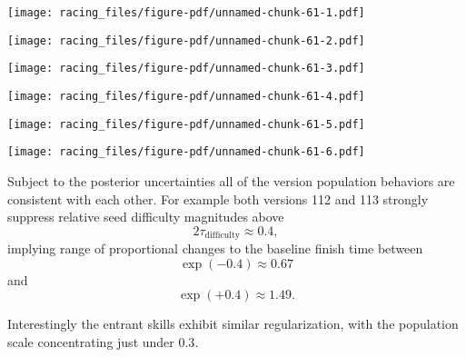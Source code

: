\documentclass[
  letterpaper,
  DIV=11,
  numbers=noendperiod]{scrartcl}
\begin{document}
\texttt{[image: racing\_files/figure-pdf/unnamed-chunk-61-1.pdf]}

\texttt{[image: racing\_files/figure-pdf/unnamed-chunk-61-2.pdf]}

\texttt{[image: racing\_files/figure-pdf/unnamed-chunk-61-3.pdf]}

\texttt{[image: racing\_files/figure-pdf/unnamed-chunk-61-4.pdf]}

\texttt{[image: racing\_files/figure-pdf/unnamed-chunk-61-5.pdf]}

\texttt{[image: racing\_files/figure-pdf/unnamed-chunk-61-6.pdf]}

Subject to the posterior uncertainties all of the version population
behaviors are consistent with each other. For example both versions 112
and 113 strongly suppress relative seed difficulty magnitudes above \[
2 \tau_{\mathrm{difficulty}} \approx 0.4,
\] implying range of proportional changes to the baseline finish time
between \[
\exp(-0.4) \approx 0.67
\] and \[
\exp(+0.4) \approx 1.49.
\]

Interestingly the entrant skills exhibit similar regularization, with
the population scale concentrating just under \(0.3\).
\end{document}
